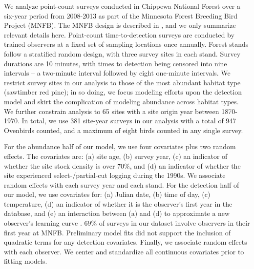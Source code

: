 \documentclass[useAMS,usenatbib,referee,12pt]{article}
\begin{document}
We analyze point-count surveys conducted in Chippewa National Forest over a six-year period from 2008-2013 as part of the Minnesota Forest Breeding Bird Project (MNFB).  The MNFB design is described in \citet{Hanowski1995}, and we only summarize relevant details here.  Point-count time-to-detection surveys are conducted by trained observers at a fixed set of sampling locations once annually.  Forest stands follow a stratified random design, with three survey sites in each stand.  Survey durations are 10 minutes, with times to detection being censored into nine intervals -- a two-minute interval followed by eight one-minute intervals.  We restrict survey sites in our analysis to those of the most abundant habitat type (sawtimber red pine); in so doing, we focus modeling efforts upon the detection model and skirt the complication of modeling abundance across habitat types.  We further constrain analysis to 65 sites with a site origin year between 1870-1970.  In total, we use 381 site-year surveys in our analysis with a total of 947 Ovenbirds counted, and a maximum of eight birds counted in any single survey.

For the abundance half of our model, we use four covariates plus two random effects.  The covariates are: (a) site age, (b) survey year, (c) an indicator of whether the site stock density is over 70\%, and (d) an indicator of whether the site experienced select-/partial-cut logging during the 1990s.  We associate random effects with each survey year and each stand.  For the detection half of our model, we use covariates for: (a) Julian date, (b) time of day, (c) temperature, (d) an indicator of whether it is the observer's first year in the database, and (e) an interaction between (a) and (d) to approximate a new observer's learning curve \citep{Alldredge2007}.  69\% of surveys in our dataset involve observers in their first year at MNFB.  Preliminary model fits did not support the inclusion of quadratic terms for any detection covariates.  Finally, we associate random effects with each observer.  We center and standardize all continuous covariates prior to fitting models.

\end{document}
